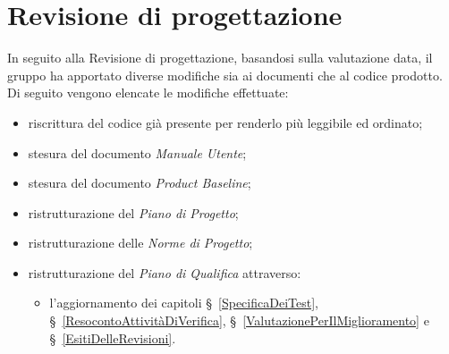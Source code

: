 \section{Revisione di progettazione}\label{EsitiDelleRevisioniRevisioneDiProgettazione}

In seguito alla Revisione di progettazione, basandosi sulla valutazione data, il gruppo ha apportato diverse modifiche sia ai documenti che al codice prodotto. Di seguito vengono elencate le modifiche effettuate:
\begin{itemize}
	\item riscrittura del codice già presente per renderlo più leggibile ed ordinato;
	\item stesura del documento \textit{Manuale Utente};
	\item stesura del documento \textit{Product Baseline};
	\item ristrutturazione del \textit{Piano di Progetto};
	\item ristrutturazione delle \textit{Norme di Progetto};
	\item ristrutturazione del \textit{Piano di Qualifica} attraverso:
	\begin{itemize}
		\item l'aggiornamento dei capitoli \S~\ref{SpecificaDeiTest}, \S~\ref{ResocontoAttivitàDiVerifica}, \S~\ref{ValutazionePerIlMiglioramento} e \S~\ref{EsitiDelleRevisioni}.
	\end{itemize}
\end{itemize}